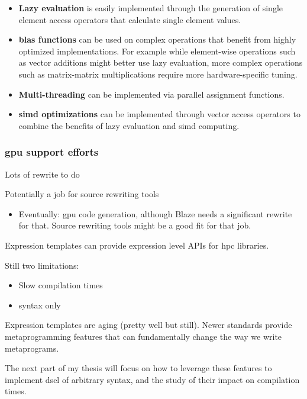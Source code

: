 \documentclass[../main]{subfiles}
\begin{document}
\begin{itemize}
\item
\textbf{Lazy evaluation} is easily implemented through the generation
of single element access operators that calculate single element values.

\item
\textbf{\gls{blas} functions} can be used on complex operations that
benefit from highly optimized implementations. For example while
element-wise operations such as vector additions might better use
lazy evaluation, more complex operations such as matrix-matrix multiplications
require more hardware-specific tuning.

\item
\textbf{Multi-threading} can be implemented via parallel assignment functions.

\item
\textbf{\gls{simd} optimizations} can be implemented through vector access
operators to combine the benefits of lazy evaluation and \gls{simd} computing.
\end{itemize}

\subsubsection{
  \acrlong{gpu} support efforts
}

Lots of rewrite to do

Potentially a job for source rewriting tools

\begin{itemize}
\item Eventually: \gls{gpu} code generation, although Blaze needs a significant
      rewrite for that. Source rewriting tools might be a good fit for that job.
\end{itemize}

Expression templates can provide expression level APIs for \gls{hpc} libraries.

Still two limitations:

\begin{itemize}
\item Slow compilation times
\item \cpp syntax only
\end{itemize}

Expression templates are aging (pretty well but still).
Newer \cpp standards provide metaprogramming features that can fundamentally
change the way we write metaprograms.

The next part of my thesis will focus on how to leverage these features to
implement \gls{dsel} of arbitrary syntax, and the study of their impact on
compilation times.
\end{document}
